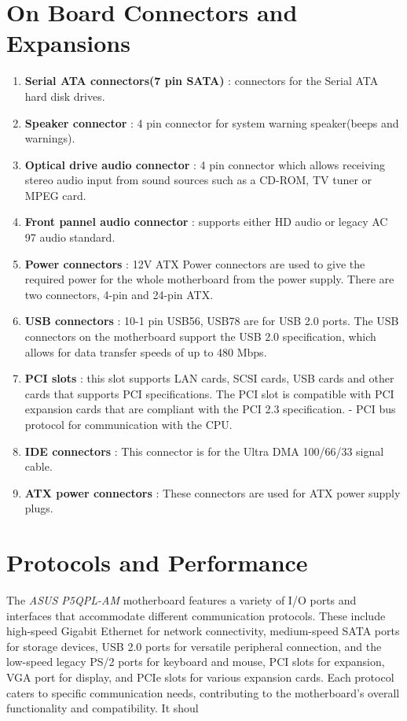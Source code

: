 \section{On Board Connectors and Expansions}
\begin{enumerate}
    \item \textbf{Serial ATA connectors(7 pin SATA)} : connectors for the Serial ATA hard disk drives.
    \item \textbf{Speaker connector} : 4 pin connector for system warning speaker(beeps and warnings).
    \item \textbf{Optical drive audio connector} : 4 pin connector which allows receiving stereo audio input from sound sources such as a CD-ROM, TV tuner or MPEG card.
    \item \textbf{Front pannel audio connector} : supports either HD audio or legacy AC 97 audio standard.
    \item \textbf{Power connectors} : 12V ATX Power connectors are used to give the required power for the whole motherboard from the power supply. There are two connectors, 4-pin and 24-pin ATX.
    \item \textbf{USB connectors} : 10-1 pin USB56, USB78 are for USB 2.0 ports. The USB connectors on the motherboard support the USB 2.0 specification, which allows for data transfer speeds of up to 480 Mbps.
    \item \textbf{PCI slots} : this slot supports LAN cards, SCSI cards, USB cards and other cards that supports PCI specifications. The PCI slot is compatible with PCI expansion cards that are compliant with the PCI 2.3 specification. - PCI bus protocol for communication with the CPU.
    \item \textbf{IDE connectors} : This connector is for the Ultra DMA 100/66/33 signal cable. 
     \item \textbf{ATX power connectors} : These connectors are used for ATX power supply plugs. 
    
\end{enumerate}
\section{Protocols and Performance}
The \emph{ASUS P5QPL-AM} motherboard features a variety of I/O ports and interfaces that accommodate different communication protocols. These include high-speed Gigabit Ethernet for network connectivity, medium-speed SATA ports for storage devices, USB 2.0 ports for versatile peripheral connection, and the low-speed legacy PS/2 ports for keyboard and mouse, PCI slots for expansion, VGA port for display, and PCIe slots for various expansion cards. Each protocol caters to specific communication needs, contributing to the motherboard's overall functionality and compatibility. It shoul


